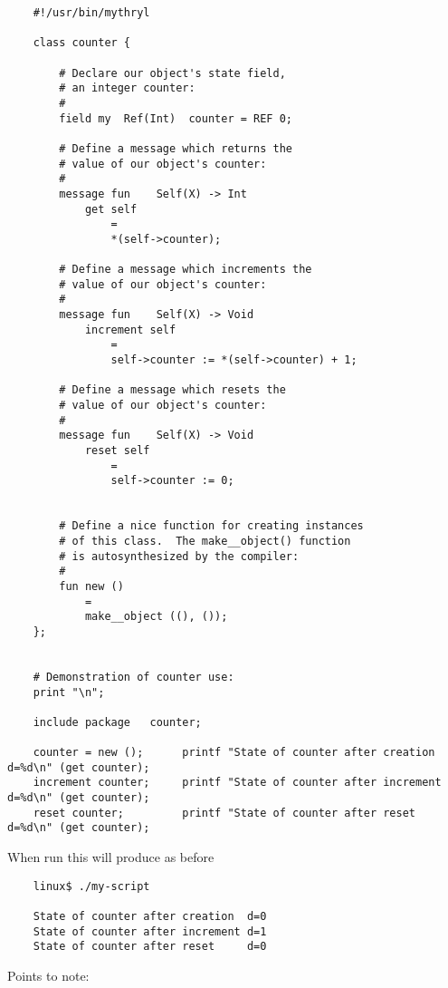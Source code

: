 \begin{verbatim}
    #!/usr/bin/mythryl

    class counter {

        # Declare our object's state field,
        # an integer counter:
        # 
        field my  Ref(Int)  counter = REF 0;

        # Define a message which returns the
        # value of our object's counter:
        #
        message fun    Self(X) -> Int
            get self
                =
                *(self->counter);

        # Define a message which increments the
        # value of our object's counter:
        #
        message fun    Self(X) -> Void
            increment self
                =
                self->counter := *(self->counter) + 1;

        # Define a message which resets the
        # value of our object's counter:
        #
        message fun    Self(X) -> Void
            reset self
                =
                self->counter := 0;


        # Define a nice function for creating instances
        # of this class.  The make__object() function
        # is autosynthesized by the compiler:
        #
        fun new ()
            =
            make__object ((), ());
    };


    # Demonstration of counter use:
    print "\n";

    include package   counter;

    counter = new ();      printf "State of counter after creation  d=%d\n" (get counter);
    increment counter;     printf "State of counter after increment d=%d\n" (get counter);
    reset counter;         printf "State of counter after reset     d=%d\n" (get counter);
\end{verbatim}

When run this will produce as before

\begin{verbatim}
    linux$ ./my-script

    State of counter after creation  d=0
    State of counter after increment d=1
    State of counter after reset     d=0
\end{verbatim}

Points to note:

